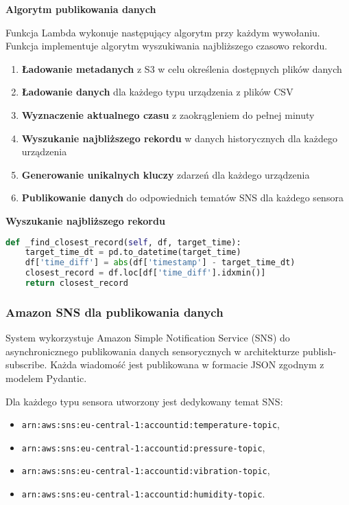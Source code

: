 \textbf{Algorytm publikowania danych}

Funkcja Lambda wykonuje następujący algorytm przy każdym wywołaniu. Funkcja implementuje algorytm wyszukiwania najbliższego czasowo rekordu.

\begin{enumerate}
    \item \textbf{Ładowanie metadanych} z S3 w celu określenia dostępnych plików danych
    \item \textbf{Ładowanie danych} dla każdego typu urządzenia z plików CSV
    \item \textbf{Wyznaczenie aktualnego czasu} z zaokrągleniem do pełnej minuty
    \item \textbf{Wyszukanie najbliższego rekordu} w danych historycznych dla każdego urządzenia
    \item \textbf{Generowanie unikalnych kluczy} zdarzeń dla każdego urządzenia
    \item \textbf{Publikowanie danych} do odpowiednich tematów SNS dla każdego sensora
\end{enumerate}

\textbf{Wyszukanie najbliższego rekordu}

\begin{lstlisting}[language=Python, caption=Algorytm wyszukiwania najbliższego rekordu]
def _find_closest_record(self, df, target_time):
    target_time_dt = pd.to_datetime(target_time)
    df['time_diff'] = abs(df['timestamp'] - target_time_dt)
    closest_record = df.loc[df['time_diff'].idxmin()]
    return closest_record
\end{lstlisting}

\subsubsection{Amazon SNS dla publikowania danych}
\label{subsec:amazon_sns}

System wykorzystuje Amazon Simple Notification Service (SNS) do asynchronicznego publikowania danych sensorycznych w architekturze publish-subscribe. Każda wiadomość jest publikowana w formacie JSON zgodnym z modelem Pydantic.

Dla każdego typu sensora utworzony jest dedykowany temat SNS:

\begin{itemize}
    \item \texttt{arn:aws:sns:eu-central-1:accountid:temperature-topic},
    \item \texttt{arn:aws:sns:eu-central-1:accountid:pressure-topic},
    \item \texttt{arn:aws:sns:eu-central-1:accountid:vibration-topic},
    \item \texttt{arn:aws:sns:eu-central-1:accountid:humidity-topic}.
\end{itemize}

